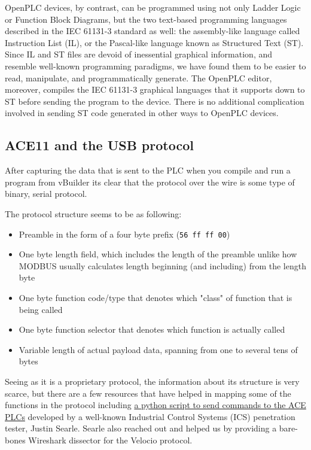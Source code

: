 \documentclass[11pt]{article}
\begin{document}
OpenPLC devices, by contrast, can be programmed using not only Ladder Logic or Function Block Diagrams, but the two text-based programming languages described in the IEC 61131-3 standard as well: the assembly-like language called Instruction List (IL), or the Pascal-like language known as Structured Text (ST). Since IL and ST files are devoid of inessential graphical information, and resemble well-known programming paradigms, we have found them to be easier to read, manipulate, and programmatically generate. The OpenPLC editor, moreover, compiles the IEC 61131-3 graphical languages that it supports down to ST before sending the program to the device. There is no additional complication involved in sending ST code generated in other ways to OpenPLC devices.

\subsection{ACE11 and the USB protocol}
\label{sec:org5c95fab}

After capturing the data that is sent to the PLC when you compile and run a program from vBuilder its clear that the protocol over the wire is some type of binary, serial protocol.

The protocol structure seems to be as following:

\begin{itemize}
\item Preamble in the form of a four byte prefix (\texttt{56 ff ff 00})
\item One byte length field, which includes the length of the preamble unlike how MODBUS usually calculates length beginning (and including) from the length byte
\item One byte function code/type that denotes which "class" of function that is being called
\item One byte function selector that denotes which function is actually called
\item Variable length of actual payload data, spanning from one to several tens of bytes
\end{itemize}

Seeing as it is a proprietary protocol, the information about its structure is very scarce, but there are a few resources that have helped in mapping some of the functions in the protocol including \href{https://github.com/ControlThings-io/ctVelocio}{a python script to send commands to the ACE PLCs} developed by a well-known Industrial Control Systems (ICS) penetration tester, Justin Searle.  Searle also reached out and helped us by providing a bare-bones Wireshark dissector for the Velocio protocol.
\end{document}
